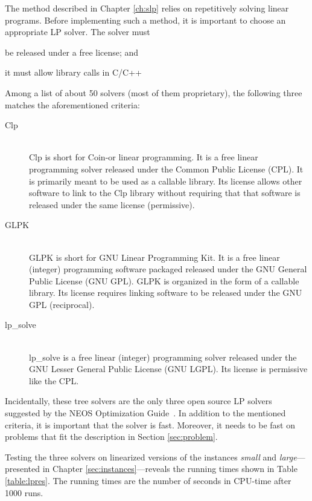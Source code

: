The method described in Chapter \ref{ch:slp} relies on repetitively solving
linear programs. Before implementing such a method, it is important to choose
an appropriate LP solver. The solver must
\begin{inparaenum}
\item be released under a free license; and
\item it must allow library calls in C/C++
\end{inparaenum}

Among a list of about 50 solvers (most of them proprietary), the
following three matches the aforementioned criteria:
\begin{description}
\item[Clp] \hfill \\
Clp is short for Coin-or linear programming. It is a free linear programming
solver released under the Common Public License (CPL). It is primarily meant to
be used as a callable library. Its license allows other software to link to the
Clp library without requiring that that software is released under the same
license (permissive). \cite{clp}
\item[GLPK] \hfill \\
GLPK is short for GNU Linear Programming Kit. It is a free linear (integer)
programming software packaged released under the GNU General Public License
(GNU GPL). GLPK is organized in the form of a callable library. Its license
requires linking software to be released under the GNU GPL (reciprocal).
\cite{glpk}
\item[lp\_solve] \hfill \\
lp\_solve is a free linear (integer) programming solver released under the GNU 
Lesser General Public License (GNU LGPL). Its license is permissive like the
CPL. \cite{lpsolve}
\end{description}

Incidentally, these tree solvers are the only three open source LP solvers
suggested by the NEOS Optimization Guide~\cite{neos}.
In addition to the mentioned criteria, it is important that the solver is
fast.
Moreover, it needs to be fast on problems that fit the description in
Section \ref{sec:problem}.

Testing the three solvers on linearized versions of the instances
\textit{small} and \textit{large}---presented in
Chapter \ref{sec:instances}---reveals the running times shown in Table
\ref{table:lpres}.
The running times are the number of seconds in CPU-time after 1000 runs.

